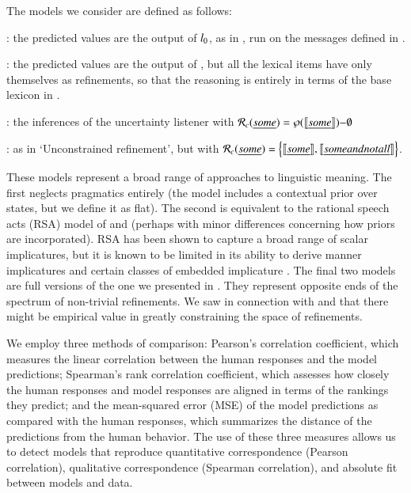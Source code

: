 \documentclass[leqno,12pt]{article}
\begin{document}
The models we consider are defined as follows:
%
\begin{examples}
\item 
  \begin{examples}
  \item {}: the predicted values are the output
    of $l_{0}$, as in , run on the messages
    defined in .
  \item {}: the predicted values are the
    output of , but all the lexical items have only
    themselves as refinements, so that the reasoning is entirely in
    terms of the base lexicon in .
  \item {}: the inferences of the
    uncertainty listener  with $\mathcal{R}_{c}(\emph{some})
    = \wp(\llbracket\emph{some}\rrbracket){-}\emptyset$
  \item {}: as in `Unconstrained
    refinement', but with $\mathcal{R}_{c}(\emph{some}) =
    \left\{ \llbracket\emph{some}\rrbracket, \llbracket\emph{some and not all}\rrbracket \right\}$.
  \end{examples}
\end{examples}

These models represent a broad range of approaches to linguistic
meaning. The first neglects pragmatics entirely (the model includes a
contextual prior over states, but we define it as flat). The second is
equivalent to the rational speech acts (RSA) model of
\citet{Frank:Goodman:2012} and \citet{Goodman:Stuhlmuller:2013}
(perhaps with minor differences concerning how priors are
incorporated). RSA has been shown to capture a broad range of scalar
implicatures, but it is known to be limited in its ability to derive
manner implicatures and certain classes of embedded implicature
\citep{Bergen:Goodman:Levy:2012,Bergen:Levy:Goodman:2014}. The final
two models are full versions of the one we presented in
. They represent opposite ends of the spectrum of
non-trivial refinements. We saw in connection with
 and  that there
might be empirical value in greatly constraining the space of
refinements.


We employ three methods of comparison: Pearson's correlation
coefficient, which measures the linear correlation between the human
responses and the model predictions; Spearman's rank correlation
coefficient, which assesses how closely the human responses and model
responses are aligned in terms of the rankings they predict; and the
mean-squared error (MSE) of the model predictions as compared with the
human responses, which summarizes the distance of the predictions
from the human behavior. The use of these three measures allows us to
detect models that reproduce quantitative correspondence (Pearson
correlation), qualitative correspondence (Spearman correlation), and absolute
fit between models and data.
\end{document}
